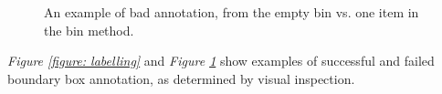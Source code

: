 \begin{figure}[h]
 \centering
 \hspace{0.5cm}
 \hspace{0.5cm}
 \hspace{0.5cm}
 \caption{An example of bad annotation, from the empty bin vs. one item in the bin method.}
 \label{figure: badlabelling}
\end{figure}
\textit{Figure \ref{figure: labelling}} and \textit{Figure \ref{figure: badlabelling}} show examples of successful and failed boundary box annotation, as determined by visual inspection. 

\clearpage

